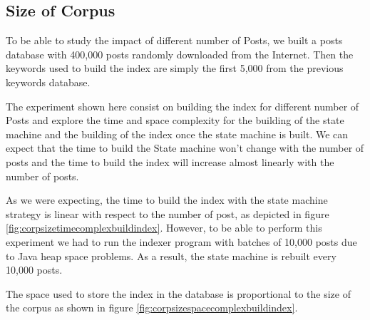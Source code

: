 \documentclass[10pt]{article}
\begin{document}
\subsection{Size of Corpus}
To be able to study the impact of different number of Posts, we built
a posts database with 400,000 posts randomly downloaded from
the Internet. Then the keywords used to build the index are simply the
first 5,000 from the previous keywords database. 

The experiment shown here consist on building the index for different
number of Posts and explore the time and space complexity for the
building of the state machine and the building of the index once the
state machine is built. We can expect that the time to build the State
machine won’t change with the number of posts and the time to build
the index will increase almost linearly with the number of posts.  

As we were expecting, the time to build the index with the state
machine strategy is linear with respect to the number of post, as
depicted in figure \ref{fig:corpsizetimecomplexbuildindex}. However, to be able
to perform this experiment we had to run the indexer program with
batches of 10,000 posts due to Java heap space problems. As a result, the state
machine is rebuilt every 10,000 posts.  

The space used to store the index in the database is
proportional to the size of the corpus as shown in figure
\ref{fig:corpsizespacecomplexbuildindex}.
\end{document}
